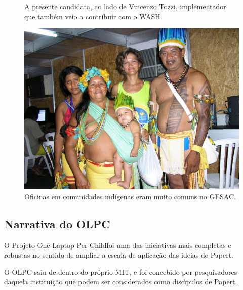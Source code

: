 \documentclass[
12pt,		%
openright,	%
twoside,  %
a4paper,			%
chapter=TITLE,		%
english,			%
french,				%
spanish,			%
brazil				%
]{USPSC-classe/USPSC}
\begin{document}
\begin{figure}[max size={\textwidth}{\textheight}]
\begin{minipage}[b]{0.4\linewidth}
                \caption{A presente candidata, ao lado de Vincenzo Tozzi, implementador que tamb\'em veio a contribuir com o WASH.}
                \label{4459669909728990ef00df4bdb6a369f3449704e}
\end{minipage}
\hspace{0.5cm}
\begin{minipage}[b]{0.4\linewidth}
        \centering
                \includegraphics[width=1.0\linewidth]{../../imagens/povo.JPG}
                \caption{Oficinas em comunidades ind\'{i}genas eram muito comuns no GESAC.}
                \label{50c13a4f82feece9e41db915d8e5bc4c5d5094dd}
\end{minipage}%
\hspace{0.5cm}
\end{figure}



\subsection[Narrativa do OLPC]{Narrativa do OLPC}\label{Narrativa do OLPC}
O Projeto \textquotedbl One Laptop Per Child foi uma das iniciativas mais completas e robustas no sentido de ampliar a escala de aplica\c{c}\~ao das ideias de Papert.














O OLPC saiu de dentro do pr\'oprio MIT, e foi concebido por pesquisadores daquela institui\c{c}\~ao que podem ser considerados como disc\'{\i}pulos de Papert.
\end{document}
